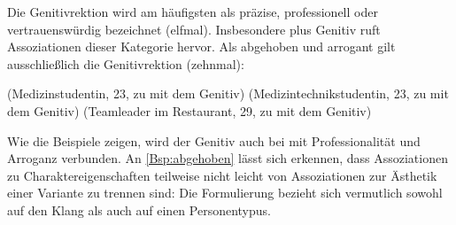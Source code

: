 Die Genitivrektion wird am häufigsten als präzise, professionell oder vertrauenswürdig bezeichnet (elfmal).
Insbesondere \waehrend{} plus Genitiv ruft Assoziationen dieser Kategorie hervor. 
Als abgehoben und arrogant gilt ausschließlich die Genitivrektion (zehnmal): 
\begin{exe}
\ex {} (Medizinstudentin, 23, zu \dank{} mit dem Genitiv)
\ex {} (Medizintechnikstudentin, 23, zu \gegenueber{} mit dem Genitiv) \label{Bsp:abgehoben}
\ex {} (Teamleader im Restaurant, 29, zu \gegenueber{} mit dem Genitiv)
\end{exe}
Wie die Beispiele zeigen, wird der Genitiv auch bei \gegenueber{} mit Professionalität und Arroganz verbunden. 
An \autoref{Bsp:abgehoben} lässt sich erkennen, dass Assoziationen zu Charaktereigenschaften teilweise nicht leicht von Assoziationen zur Ästhetik einer Variante zu trennen sind: 
Die Formulierung  bezieht sich vermutlich sowohl auf den Klang als auch auf einen Personentypus. 


